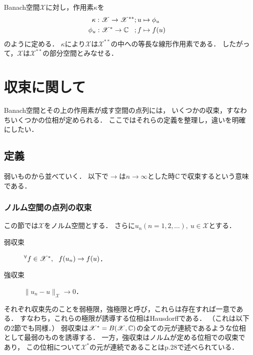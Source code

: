 \documentclass[a4j]{jsarticle}
\newcommand{\spX}{\mathscr{X}}
\begin{document}
    \begin{Thm}[定理8.23, p.189] \label{them8:23}
        Banach空間$\spX$に対し，作用素$\kappa$を
        \begin{align*}
            \kappa: \spX \to \spX^{\ast \ast}     &;u \mapsto \phi_{u} \\
            \phi_u: \mathscr{X^{\ast}} \to \C \hspace{3truemm}&;f \mapsto f(u)
        \end{align*}
        のように定める．
        $\kappa$により$\spX$は$\spX^{\ast \ast}$の中への等長な線形作用素である．
        したがって，$\spX$は$\spX^{\ast \ast}$の部分空間とみなせる．
    \end{Thm}

    \section{収束に関して}
    Banach空間とその上の作用素が成す空間の点列には，
    いくつかの収束，すなわちいくつかの位相が定められる．
    ここではそれらの定義を整理し，違いを明確にしたい．
    \subsection{定義}
    弱いものから並べていく．
    以下で$\to$は$n \to \infty$とした時$\mathbb{C}$で収束するという意味である．
    \newpage
    \subsubsection{ノルム空間の点列の収束}
    この節では$\spX$をノルム空間とする．
    さらに$u_n (n=1,2,\dots),~ u \in \spX$とする．
    \begin{description}
        \item[弱収束] $\Forall{f \in \spX^*} f(u_n) \to f(u)$．
        \item[強収束] $\|u_n-u\|_{\spX} \to 0$．
    \end{description}
    それぞれ収束先のことを弱極限，強極限と呼び，これらは存在すれば一意である．
    すなわち，これらの極限が誘導する位相はHausdorffである．
    （これは以下の2節でも同様．）
    弱収束は$\spX^*=B(\spX,\C)$の全ての元が連続であるような位相として最弱のものを誘導する．
    一方，強収束はノルムが定める位相での収束であり，
    この位相について$\spX^*$の元が連続であることはp.28で述べられている．
\end{document}
